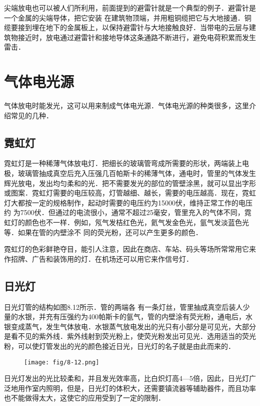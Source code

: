 尖端放电也可以被人们所利用，前面提到的避雷针就是一个典型的例子．避雷针是一个金属的尖端导体，把它安装
在建筑物顶端，并用粗铜缆把它与大地接通．铜缆要接到埋在地下的金属板上，以保持避雷针与大地接触良好．当带电的云层与建筑物接近时，放电通过避雷针和接地导体这条通路不断进行，避免电荷积累而发生雷击．

\section{气体电光源}

气体放电时能发光，这可以用来制成气体电光源．气体电光源的种类很多，这里介绍常见的几种．

\subsection{霓虹灯}


霓虹灯是一种稀薄气体放电灯．把细长的玻璃管弯成所需要的形状，两端装上电极，玻璃管抽成真空后充入压强几百帕斯卡的稀薄气体，通电时，管里的气体发生辉光放电，发出均匀柔和的光．把不需要发光的部位的管壁涂黑，就可以显出字形或图案．霓虹灯需要的电压较高，灯管越细、越长，需要的电压越高．现在，霓虹灯大都按一定的规格制作，起动时需要的电压约为15000伏，维持正常工作的电压约
为7500伏．但通过的电流很小，通常不超过25毫安，管里充入的气体不同，霓虹灯的颜色也不一样．例如，氖气发桔红色光，氦气发金色光，氩气发淡蓝色光等．如果在管的内壁涂不
同的荧光粉，还可以产生更多的颜色．

霓虹灯的色彩鲜艳夺目，能引人注意，因此在商店、车站、码头等场所常常用它来作招牌、广告和装饰用的灯．在机场还可以用它来作信号灯．

\subsection{日光灯}
日光灯管的结构如图8.12所示．管的两端各
有一条灯丝，管里抽成真空后装人少量的水银，并充有压强约为400帕斯卡的氩气，管的内壁涂有荧光粉，通电后，水银变成蒸气，发生气体放电．水银蒸气放电发出的光只有小部分是可见光，大部分是看不见的紫外线．紫外线射到荧光粉上，使荧光粉发出可见光．选用适当的荧光粉，可以使灯管发出的光的颜色接近日光，日光灯的名子就是由此而来的．
\begin{figure}[htp]\centering
    \texttt{[image: fig/8-12.png]}
    \caption{}
    \end{figure}

日光灯发出的光比较柔和，并且发光效率高，比白炽灯高4—5倍，因此，日光灯广泛地用作室内照明，但是，日光灯的体积大，还需要镇流器等辅助器件，而且功率也不能做得太大，这使它的应用受到了一定的限制．

